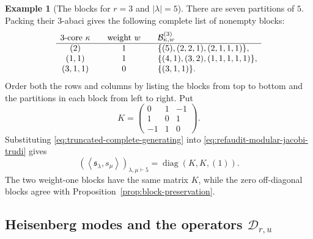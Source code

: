 \documentclass[12pt,reqno,a4paper]{amsart}
\numberwithin{equation}{section}
\numberwithin{figure}{section}
\theoremstyle{plain}
\theoremstyle{definition}
\newtheorem{example}[theorem]{Example}
\newcommand{\inner}[2]{\left\langle #1,#2\right\rangle}
\begin{document}
\begin{example}[The blocks for $r=3$ and $|\lambda|=5$]
\label{ex:block-preservation-p3-d5}
There are seven partitions of $5$.  Packing their $3$-abaci gives the
following complete list of nonempty blocks:
\[
\begin{array}{c@{\qquad}c@{\qquad}l}
\text{$3$-core }\kappa&\text{weight }w&
   \mathcal B_{\kappa,w}^{(3)}\\ \hline
(2)&1&\{(5),(2,2,1),(2,1,1,1)\},\\
(1,1)&1&\{(4,1),(3,2),(1,1,1,1,1)\},\\
(3,1,1)&0&\{(3,1,1)\}.
\end{array}
\]
Order both the rows and columns by listing the blocks from top to
bottom and the partitions in each block from left to right.  Put
\[
 K=\begin{pmatrix}
  0&1&-1\\
  1&0&1\\
  -1&1&0
 \end{pmatrix}.
\]
Substituting \eqref{eq:truncated-complete-generating} into
\eqref{eq:refaudit-modular-jacobi-trudi} gives
\begin{equation}\label{eq:p3-degree-five-block-matrix}
 \left(\inner{\mathfrak s_\lambda}{s_\mu}\right)_{
    \lambda,\mu\vdash5}
 =\operatorname{diag}(K,K,(1)).
\end{equation}
The two weight-one blocks have the same matrix $K$, while the zero
off-diagonal blocks agree with Proposition~\ref{prop:block-preservation}.
\end{example}

\subsection{Heisenberg modes and the operators
\texorpdfstring{$\mathcal D_{r,u}$}{D(r,u)}}
\label{subsec:power-sum-scaling}
\end{document}
